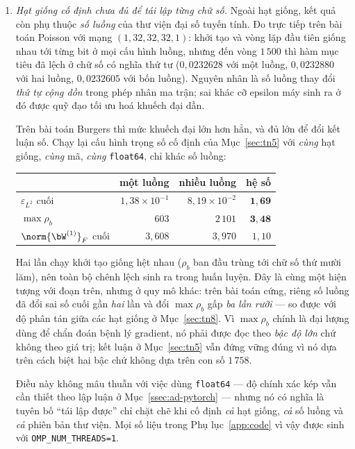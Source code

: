 \begin{enumerate}[label=(\arabic*),leftmargin=2.2em,itemsep=4pt]
\item \emph{Hạt giống cố định chưa đủ để tái lập từng chữ số.} Ngoài hạt giống,
kết quả còn phụ thuộc \emph{số luồng} của thư viện đại số tuyến tính. Đo trực
tiếp trên bài toán Poisson với mạng $(1,32,32,32,1)$: khởi tạo và vòng lặp đầu
tiên giống nhau tới từng bit ở mọi cấu hình luồng, nhưng đến vòng $1\,500$ thì
hàm mục tiêu đã lệch ở chữ số có nghĩa thứ tư ($0{,}0232628$ với một luồng,
$0{,}0232880$ với hai luồng, $0{,}0232605$ với bốn luồng). Nguyên nhân là số
luồng thay đổi \emph{thứ tự cộng dồn} trong phép nhân ma trận; sai khác cỡ
epsilon máy sinh ra ở đó được quỹ đạo tối ưu hoá khuếch đại dần.

Trên bài toán Burgers thì mức khuếch đại lớn hơn hẳn, và đủ lớn để đổi kết luận
số. Chạy lại cấu hình trọng số cố định của Mục~\ref{sec:tn5} với \emph{cùng} hạt
giống, \emph{cùng} mã, \emph{cùng} \texttt{float64}, chỉ khác số luồng:

\begin{center}
\small
\begin{tabular}{@{}l r r r@{}}
\toprule
& một luồng & nhiều luồng & hệ số \\
\midrule
$\varepsilon_{L^2}$ cuối & $1{,}38\times10^{-1}$ & $8{,}19\times10^{-2}$
  & $\mathbf{1{,}69}$ \\
$\max\rho_b$            & $603$                 & $2\,101$
  & $\mathbf{3{,}48}$ \\
$\norm{\bW^{(1)}}_F$ cuối & $3{,}608$           & $3{,}970$ & $1{,}10$ \\
\bottomrule
\end{tabular}
\end{center}

Hai lần chạy khởi tạo giống hệt nhau ($\rho_b$ ban đầu trùng tới chữ số thứ mười
lăm), nên toàn bộ chênh lệch sinh ra trong huấn luyện. Đây là cùng một hiện tượng
với đoạn trên, nhưng ở quy mô khác: trên bài toán cứng, riêng số luồng đã đổi sai
số cuối gần \emph{hai} lần và đổi $\max\rho_b$ gấp \emph{ba lần rưỡi} --- so được
với độ phân tán giữa các hạt giống ở Mục~\ref{sec:tn8}. Vì $\max\rho_b$ chính là
đại lượng dùng để chẩn đoán bệnh lý gradient, nó phải được đọc theo \emph{bậc độ
lớn} chứ không theo giá trị; kết luận ở Mục~\ref{sec:tn5} vẫn đứng vững đúng vì
nó dựa trên cách biệt hai bậc chứ không dựa trên con số $1\,758$.

Điều này không mâu thuẫn với việc dùng \texttt{float64} --- độ chính xác kép vẫn
cần thiết theo lập luận ở Mục~\ref{ssec:ad-pytorch} --- nhưng nó có nghĩa là
tuyên bố ``tái lập được'' chỉ chặt chẽ khi cố định \emph{cả} hạt giống,
\emph{cả} số luồng và \emph{cả} phiên bản thư viện. Mọi số liệu trong
Phụ lục~\ref{app:code} vì vậy được sinh với \texttt{OMP\_NUM\_THREADS=1}.


\end{enumerate}
